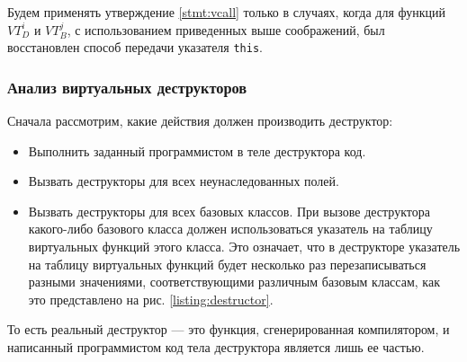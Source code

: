 Будем применять утверждение \ref{stmt:vcall} только в случаях, когда для функций $VT_D^i$ и $VT_B^j$, с использованием приведенных выше соображений, был восстановлен способ передачи указателя \lstinline{this}.




\subsubsection{Анализ виртуальных деструкторов}\label{chapter:destructors}
Сначала рассмотрим, какие действия должен производить деструктор:

\begin{itemize}
\item Выполнить заданный программистом в теле деструктора код.
\item Вызвать деструкторы для всех неунаследованных полей.
\item Вызвать деструкторы для всех базовых классов. При вызове деструктора какого-либо базового класса должен использоваться указатель на таблицу виртуальных функций этого класса. Это означает, что в деструкторе указатель на таблицу виртуальных функций будет несколько раз перезаписываться разными значениями, соответствующими различным базовым классам, как это представлено на рис. \ref{listing:destructor}.
\end{itemize}

То есть реальный деструктор --- это функция, сгенерированная компилятором, и написанный программистом код тела деструктора является лишь ее частью.

